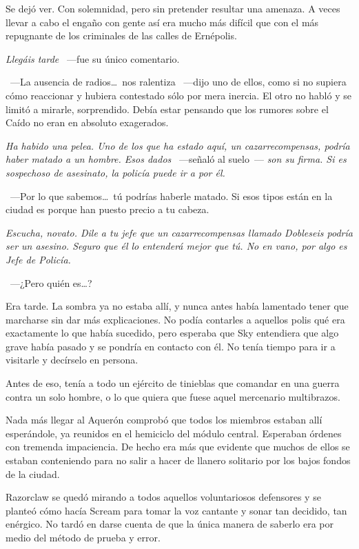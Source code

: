 Se dejó ver. Con solemnidad, pero sin pretender resultar una amenaza. A veces llevar a cabo el engaño con gente así era mucho más difícil que con el más repugnante de los criminales de las calles de Ernépolis.

\emph{Llegáis tarde} ~---fue su único comentario.

~---La ausencia de radios\dots\ nos ralentiza ~---dijo uno de ellos, como si no supiera cómo reaccionar y hubiera contestado sólo por mera inercia. El otro no habló y se limitó a mirarle, sorprendido. Debía estar pensando que los rumores sobre el Caído no eran en absoluto exagerados.

\emph{Ha habido una pelea. Uno de los que ha estado aquí, un cazarrecompensas, podría haber matado a un hombre. Esos dados} ~---señaló al suelo~--- \emph{son su firma. Si es sospechoso de asesinato, la policía puede ir a por él.}

~---Por lo que sabemos\dots\ tú podrías haberle matado. Si esos tipos están en la ciudad es porque han puesto precio a tu cabeza.

\emph{Escucha, novato. Dile a tu jefe que un cazarrecompensas llamado Dobleseis podría ser un asesino. Seguro que él lo entenderá mejor que tú. No en vano, por algo es Jefe de Policía.}

~---¿Pero quién es\dots?

Era tarde. La sombra ya no estaba allí, y nunca antes había lamentado tener que marcharse sin dar más explicaciones. No podía contarles a aquellos polis qué era exactamente lo que había sucedido, pero esperaba que Sky entendiera que algo grave había pasado y se pondría en contacto con él. No tenía tiempo para ir a visitarle y decírselo en persona.

Antes de eso, tenía a todo un ejército de tinieblas que comandar en una guerra contra un solo hombre, o lo que quiera que fuese aquel mercenario multibrazos.

\parbreak
Nada más llegar al Aquerón comprobó que todos los miembros estaban allí esperándole, ya reunidos en el hemiciclo del módulo central. Esperaban órdenes con tremenda impaciencia. De hecho era más que evidente que muchos de ellos se estaban conteniendo para no salir a hacer de llanero solitario por los bajos fondos de la ciudad.

Razorclaw se quedó mirando a todos aquellos voluntariosos defensores y se planteó cómo hacía Scream para tomar la voz cantante y sonar tan decidido, tan enérgico. No tardó en darse cuenta de que la única manera de saberlo era por medio del método de prueba y error.

